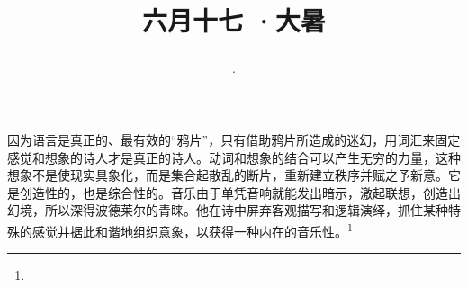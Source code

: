 \title{\date[d=22,m=7,y=2024][year:cn-y,年,month:cn,day:cn,日,·,weekday]·六月十七 ·大暑}
因为语言是真正的、最有效的“鸦片”，只有借助鸦片所造成的迷幻，用词汇来固定感觉和想象的诗人才是真正的诗人。动词和想象的结合可以产生无穷的力量，这种想象不是使现实具象化，而是集合起散乱的断片，重新建立秩序并赋之予新意。它是创造性的，也是综合性的。音乐由于单凭音响就能发出暗示，激起联想，创造出幻境，所以深得波德莱尔的青睐。他在诗中屏弃客观描写和逻辑演绎，抓住某种特殊的感觉并据此和谐地组织意象，以获得一种内在的音乐性。\footnote{ }


